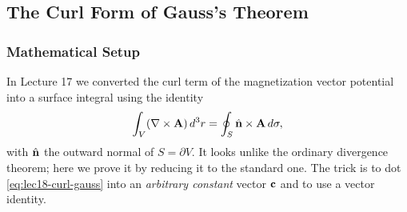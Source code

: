 \subsection{The Curl Form of Gauss's Theorem}\label{subsec:lec18-curl-gauss}

\subsubsection*{Mathematical Setup}
In Lecture 17 we converted the curl term of the magnetization vector potential into a
surface integral using the identity
\begin{equation}\label{eq:lec18-curl-gauss}
  \int_V (\nabla\times\mathbf{A})\,d^3r=\oint_S \hat{\mathbf{n}}\times\mathbf{A}\,d\sigma,
\end{equation}
with $\hat{\mathbf{n}}$ the outward normal of $S=\partial V$. It looks unlike the ordinary
divergence theorem; here we prove it by reducing it to the standard one. The trick is to
dot \eqref{eq:lec18-curl-gauss} into an \emph{arbitrary constant} vector $\mathbf{c}$ and
to use a vector identity.


